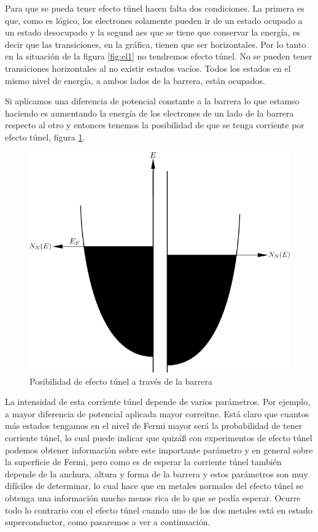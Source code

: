 Para que se pueda tener efecto túnel hacen falta dos condiciones. La primera es que, como es lógico, los electrones solamente pueden ir de un estado ocupado a un estado desocupado y la segund aes que se tiene que conservar la energía, es decir que las transiciones, en la gráfica, tienen que ser horizontales. Por lo tanto en la situación de la figura \ref{fig:el1} no tendremos efecto túnel. No se pueden tener transiciones horizontales al no existir estados vacíos. Todos los estados en el mismo nivel de energía, a ambos lados de la barrera, están ocupados.

Si aplicamos una diferencia de potencial constante a la barrera lo que estamso haciendo es aumentando la energía de los electrones de un lado de la barrera respecto al otro y entonces tenemos la posibilidad de que se tenga corriente por efecto túnel, figura \ref{fig:el2}.

\begin{figure}[H]
\centering \includegraphics[width=0.8\linewidth]{img/el2.png}
\caption{Posibilidad de efecto túnel a través de la barrera}
\label{fig:el2}
\end{figure}

La intensidad de esta corriente túnel depende de varios parámetros. Por ejemplo, a mayor diferencia de potencial aplicada mayor correitne. Está claro que cuantos más estados tengamos en el nivel de Fermi mayor será la probabilidad de tener corriente túnel, lo cual puede indicar que quizáß con experimentos de efecto túnel podemos obtener información sobre este importante parámetro y en general sobre la superficie de Fermi, pero como es de esperar la corriente túnel también depende de la anchura, altura y forma de la barrera y estos parámetros son muy difíciles de determinar, lo cual hace que en metales normales del efecto túnel se obtenga una información mucho menos rica de lo que se podía esperar. Ocurre todo lo contrario con el efecto túnel cuando uno de los dos metales está en estado superconductor, como pasaremos a ver a continuación.

